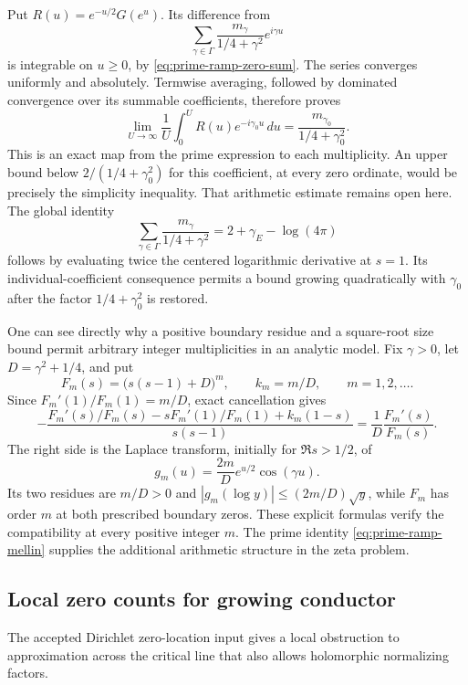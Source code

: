 Put $R(u)=e^{-u/2}G(e^u)$. Its difference from
\[
 \sum_{\gamma\in\Gamma}
       \frac{m_\gamma}{1/4+\gamma^2}e^{i\gamma u}
\]
is integrable on $u\ge0$, by \eqref{eq:prime-ramp-zero-sum}.
The series converges uniformly and absolutely. Termwise averaging,
followed by dominated convergence over its summable coefficients,
therefore proves
\begin{equation}\label{eq:prime-ramp-coefficient}
 \lim_{U\to\infty}\frac1U\int_0^U
            R(u)e^{-i\gamma_0u}\,du
       =\frac{m_{\gamma_0}}{1/4+\gamma_0^2}.
\end{equation}
This is an exact map from the prime expression to each multiplicity.
An upper bound below $2/(1/4+\gamma_0^2)$ for this coefficient,
at every zero ordinate, would be precisely the simplicity
inequality. That arithmetic estimate remains open here.
The global identity
\[
 \sum_{\gamma\in\Gamma}\frac{m_\gamma}{1/4+\gamma^2}
       =2+\gamma_E-\log(4\pi)
\]
follows by evaluating twice the centered logarithmic derivative
at $s=1$. Its individual-coefficient consequence permits a bound
growing quadratically with $\gamma_0$ after the factor
$1/4+\gamma_0^2$ is restored.

One can see directly why a positive boundary residue and a
square-root size bound permit arbitrary integer multiplicities
in an analytic model. Fix $\gamma>0$, let $D=\gamma^2+1/4$,
and put
\[
 F_m(s)=\bigl(s(s-1)+D\bigr)^m,\qquad
 k_m=m/D,\qquad m=1,2,\ldots.
\]
Since $F_m'(1)/F_m(1)=m/D$, exact cancellation gives
\[
 -\frac{F_m'(s)/F_m(s)-sF_m'(1)/F_m(1)+k_m(1-s)}{s(s-1)}
 =\frac1D\frac{F_m'(s)}{F_m(s)}.
\]
The right side is the Laplace transform, initially for
$\Re s>1/2$, of
\[
 g_m(u)=\frac{2m}{D}e^{u/2}\cos(\gamma u).
\]
Its two residues are $m/D>0$ and
$|g_m(\log y)|\le(2m/D)\sqrt y$, while $F_m$ has order $m$
at both prescribed boundary zeros. These explicit formulas
verify the compatibility at every positive integer $m$.
The prime identity \eqref{eq:prime-ramp-mellin} supplies the
additional arithmetic structure in the zeta problem.

\subsection{Local zero counts for growing conductor}
\label{subsec:conductor-local-count}
The accepted Dirichlet zero-location input gives a local obstruction
to approximation across the critical line that also allows
holomorphic normalizing factors.

